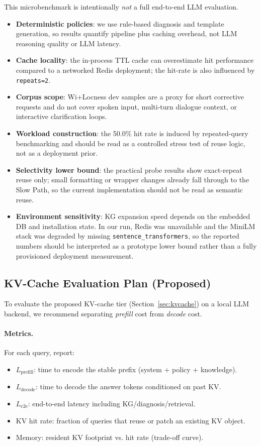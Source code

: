 \documentclass[11pt,a4paper,twocolumn]{article}
\begin{document}
This microbenchmark is intentionally \emph{not} a full end-to-end LLM evaluation.
\begin{itemize}[leftmargin=*]
  \item \textbf{Deterministic policies}: we use rule-based diagnosis and template generation, so results quantify pipeline plus caching overhead, not LLM reasoning quality or LLM latency.
  \item \textbf{Cache locality}: the in-process TTL cache can overestimate hit performance compared to a networked Redis deployment; the hit-rate is also influenced by \texttt{repeats=2}.
  \item \textbf{Corpus scope}: Wi+Locness dev samples are a proxy for short corrective requests and do not cover spoken input, multi-turn dialogue context, or interactive clarification loops.
  \item \textbf{Workload construction}: the 50.0\% hit rate is induced by repeated-query benchmarking and should be read as a controlled stress test of reuse logic, not as a deployment prior.
  \item \textbf{Selectivity lower bound}: the practical probe results show exact-repeat reuse only; small formatting or wrapper changes already fall through to the Slow Path, so the current implementation should not be read as semantic reuse.
  \item \textbf{Environment sensitivity}: KG expansion speed depends on the embedded DB and installation state. In our run, Redis was unavailable and the MiniLM stack was degraded by missing \texttt{sentence\_transformers}, so the reported numbers should be interpreted as a prototype lower bound rather than a fully provisioned deployment measurement.
\end{itemize}

\subsection{KV-Cache Evaluation Plan (Proposed)}

To evaluate the proposed KV-cache tier (Section~\ref{sec:kvcache}) on a local LLM backend, we recommend separating \emph{prefill} cost from \emph{decode} cost.

\paragraph{Metrics.} For each query, report:
\begin{itemize}[leftmargin=*]
  \item $L_{\text{prefill}}$: time to encode the stable prefix (system + policy + knowledge).
  \item $L_{\text{decode}}$: time to decode the answer tokens conditioned on past KV.
  \item $L_{\text{e2e}}$: end-to-end latency including KG/diagnosis/retrieval.
  \item KV hit rate: fraction of queries that reuse or patch an existing KV object.
  \item Memory: resident KV footprint vs. hit rate (trade-off curve).
\end{itemize}
\end{document}
